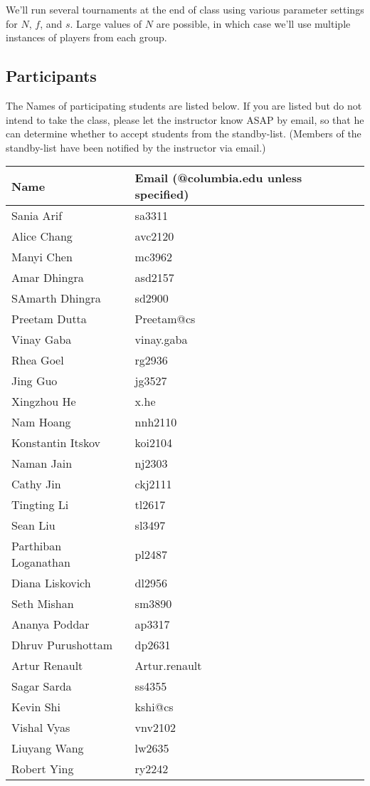 We'll run several tournaments at the end of class using various
parameter settings for $N$, $f$, and $s$. Large values of $N$ are
possible, in which case we'll use multiple instances of players from
each group.

\subsection{Participants}

The Names of participating students are listed below.  If you are listed but do not intend to
take the class, please let the instructor know ASAP by email, so that
he can determine whether to accept students from the standby-list.
(Members of the standby-list have been notified by the instructor via email.)

\begin{tabular}{ll}
Name & Email (@columbia.edu unless specified) \\ \hline
Sania Arif & sa3311 \\
Alice Chang & avc2120 \\
Manyi Chen & mc3962 \\
Amar Dhingra & asd2157 \\
SAmarth Dhingra & sd2900 \\
Preetam Dutta & Preetam@cs \\
Vinay Gaba & vinay.gaba \\
Rhea Goel & rg2936 \\
Jing Guo & jg3527 \\
Xingzhou He & x.he \\
Nam Hoang & nnh2110 \\
Konstantin Itskov & koi2104 \\
Naman Jain & nj2303 \\
Cathy Jin & ckj2111 \\
Tingting Li & tl2617 \\
Sean Liu & sl3497 \\
Parthiban Loganathan & pl2487 \\
Diana Liskovich & dl2956 \\
Seth Mishan & sm3890 \\
Ananya Poddar & ap3317 \\
Dhruv Purushottam & dp2631 \\
Artur Renault & Artur.renault \\
Sagar Sarda & ss4355 \\
Kevin Shi & kshi@cs \\
Vishal Vyas & vnv2102 \\
Liuyang Wang & lw2635 \\
Robert Ying & ry2242 \\
\end{tabular}

